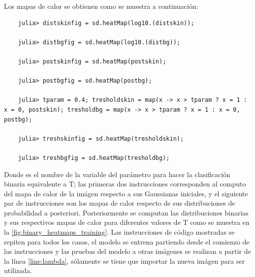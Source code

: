 Los mapas de calor se obtienen como se muestra a continuación:
\begin{verbatim}
    julia> distskinfig = sd.heatMap(log10.(distskin));

    julia> distbgfig = sd.heatMap(log10.(distbg));

    julia> postskinfig = sd.heatMap(postskin);

    julia> postbgfig = sd.heatMap(postbg);

    julia> tparam = 0.4; tresholdskin = map(x -> x > tparam ? x = 1 : x = 0, postskin); tresholdbg = map(x -> x > tparam ? x = 1 : x = 0, postbg);

    julia> treshskinfig = sd.heatMap(tresholdskin);

    julia> treshbgfig = sd.heatMap(tresholdbg);
\end{verbatim}

Donde  es el nombre de la variable del parámetro para hacer la clasificación binaria equivalente a $\text{T}$; las primeras dos instrucciones corresponden al computo del mapa de calor de la imágen respecto a sus Gaussianas iniciales, y el siguiente par de instrucciones son los mapas de calor respecto de sus distribuciones de probabilidad a posteriori. Posteriormente se computan las distribuciones binarias y sus respectivos mapas de calor para diferentes valores de $\text{T}$ como se muestra en la \cref{fig:binary_heatmaps_training}. Las instrucciones de código mostradas se repiten para todos los casos, el modelo se entrena partiendo desde el comienzo de las instrucciones y las pruebas del modelo a otras imágenes se realizan a partir de la línea \ref{line:lambda}, sólamente se tiene que importar la nueva imágen para ser utilizada.

